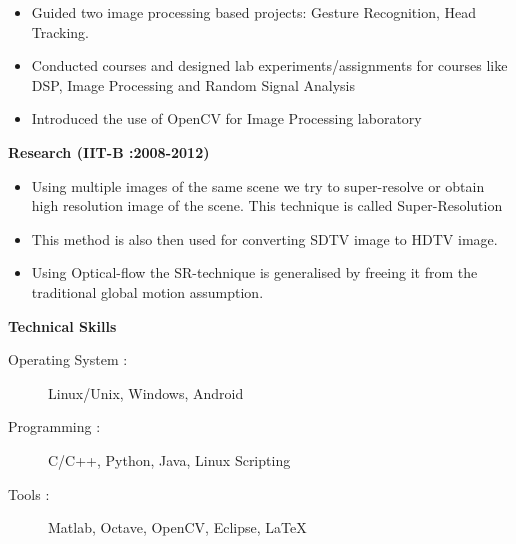 \documentclass[a4paper,12pt]{article}
\begin{document}
\begin{itemize}
\item Guided  two image processing based projects: Gesture Recognition, Head Tracking.   
\item Conducted courses and designed  lab experiments/assignments for courses
like DSP, Image Processing and Random Signal Analysis  
\item Introduced the use of OpenCV for Image Processing laboratory
\end{itemize}
\bigskip

\colorbox{titleColor}{\parbox{6.7in}{\textbf{Research (IIT-B :2008-2012)}}}
\begin{itemize}
\item Using multiple images of the same scene we try to super-resolve or obtain
high resolution image of the scene. This technique is called Super-Resolution
 \item This method is also then used for
converting SDTV image to HDTV image.
\item  Using Optical-flow the SR-technique is generalised by freeing it from the traditional global motion assumption. 
\end{itemize}
\bigskip

\colorbox{titleColor}{\parbox{6.7in}{\textbf{Technical Skills}}}
\begin{description}
\item [Operating System :] Linux/Unix, Windows, Android
\item [Programming      :]  C/C++, Python, Java, Linux Scripting 
\item [Tools            :] Matlab, Octave, OpenCV, Eclipse, \LaTeX 
\end{description}
\bigskip
\end{document}
